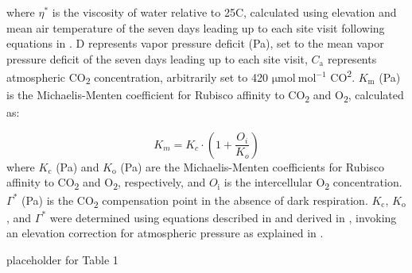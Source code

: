     where $\eta^{*}$ is the viscosity of water relative to 25\textdegree{}C, calculated using elevation and mean air temperature of the seven days leading up to each site visit following equations in . D represents vapor pressure deficit (Pa), set to the mean vapor pressure deficit of the seven days leading up to each site visit, $C_\mathrm{a}$ represents atmospheric CO\textsubscript{2} concentration, arbitrarily set to 420 $\mathrm{\mu mol\ mol^{-1}}$ CO\textsuperscript{2}. $K_\mathrm{m}$ (Pa) is the Michaelis-Menten coefficient for Rubisco affinity to CO\textsubscript{2} and O\textsubscript{2}, calculated as:
    
    \begin{equation} \label{eq_4.6}
        K_{m} = K_{c} \cdot \left ( 1 + \frac{O_i}{K_o} \right )
    \end{equation}
    where $K_\mathrm{c}$ (Pa) and $K_\mathrm{o}$ (Pa) are the Michaelis-Menten coefficients for Rubisco affinity to CO\textsubscript{2} and O\textsubscript{2}, respectively, and $O_\mathrm{i}$  is the intercellular O\textsubscript{2} concentration. $\Gamma^{*}$ (Pa) is the CO\textsubscript{2} compensation point in the absence of dark respiration. $K_\mathrm{c}$, $K_\mathrm{o}$, and $\Gamma^{*}$ were determined using equations described in  and derived in , invoking an elevation correction for atmospheric pressure as explained in .

    \clearpage

    \newpage
    placeholder for Table 1
    \clearpage

